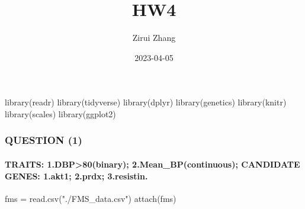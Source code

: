 \documentclass[
]{article}
\title{HW4}
\author{Zirui Zhang}
\date{2023-04-05}
\newenvironment{Shaded}{\begin{snugshade}}{\end{snugshade}}
\newcommand{\FunctionTok}[1]{\textcolor[rgb]{0.00,0.00,0.00}{#1}}
\newcommand{\NormalTok}[1]{#1}
\newcommand{\OtherTok}[1]{\textcolor[rgb]{0.56,0.35,0.01}{#1}}
\newcommand{\StringTok}[1]{\textcolor[rgb]{0.31,0.60,0.02}{#1}}
\begin{document}
\maketitle

\begin{Shaded}
\begin{Highlighting}[]
\FunctionTok{library}\NormalTok{(readr)}
\FunctionTok{library}\NormalTok{(tidyverse)}
\FunctionTok{library}\NormalTok{(dplyr)}
\FunctionTok{library}\NormalTok{(genetics)}
\FunctionTok{library}\NormalTok{(knitr)}
\FunctionTok{library}\NormalTok{(scales)}
\FunctionTok{library}\NormalTok{(ggplot2)}
\end{Highlighting}
\end{Shaded}

\hypertarget{question-1}{%
\subsubsection{QUESTION (1)}\label{question-1}}

\hypertarget{traits-1.dbp80binary-2.mean_bpcontinuous-candidate-genes-1.akt1-2.prdx-3.resistin.}{%
\paragraph{TRAITS: 1.DBP\textgreater80(binary); 2.Mean\_BP(continuous);
CANDIDATE GENES: 1.akt1; 2.prdx;
3.resistin.}\label{traits-1.dbp80binary-2.mean_bpcontinuous-candidate-genes-1.akt1-2.prdx-3.resistin.}}

\begin{Shaded}
\begin{Highlighting}[]
\NormalTok{fms }\OtherTok{=} \FunctionTok{read.csv}\NormalTok{(}\StringTok{"./FMS\_data.csv"}\NormalTok{)}
\FunctionTok{attach}\NormalTok{(fms)}
\end{Highlighting}
\end{Shaded}
\end{document}
